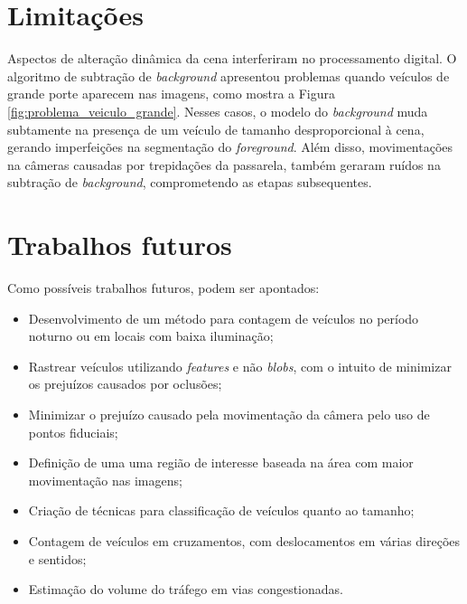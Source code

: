\section{Limitações} %
\label{sec:pontos_negativos_do_m_todo}

Aspectos de alteração dinâmica da cena interferiram no processamento digital. O algoritmo de subtração de \textit{background} apresentou problemas quando veículos de grande porte aparecem nas imagens, como mostra a Figura \ref{fig:problema_veiculo_grande}. Nesses casos, o modelo do \textit{background} muda subtamente na presença de um veículo de tamanho desproporcional à cena, gerando imperfeições na segmentação do \textit{foreground}. Além disso, movimentações na câmeras causadas por trepidações da passarela, também geraram ruídos na subtração de \textit{background}, comprometendo as etapas subsequentes.



\section{Trabalhos futuros} %

Como possíveis trabalhos futuros, podem ser apontados:

\begin{itemize}
  \item Desenvolvimento de um método para contagem de veículos no período noturno ou em locais com baixa iluminação;
  \item Rastrear veículos utilizando \textit{features} e não \textit{blobs}, com o intuito de minimizar os prejuízos causados por oclusões;
  \item Minimizar o prejuízo causado pela movimentação da câmera pelo uso de pontos fiduciais;
  \item Definição de uma uma região de interesse baseada na área com maior movimentação nas imagens;
  \item Criação de técnicas para classificação de veículos quanto ao tamanho;
  \item Contagem de veículos em cruzamentos, com deslocamentos em várias direções e sentidos;
  \item Estimação do volume do tráfego em vias congestionadas.
\end{itemize}

\label{sec:trabalhos_futuros}

